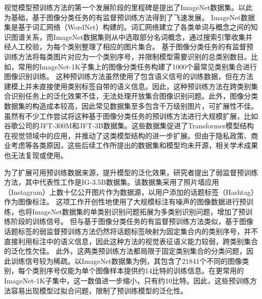 视觉模型预训练方法的第一个发展阶段的里程碑是提出了ImageNet数据集\cite{deng2009imagenet}。以此为基础，基于图像分类任务的有监督预训练方法\cite{alexnet,resnet,googlenet,densenet}得到了飞速发展。
ImageNet数据集是基于词汇网络\cite{miller1995wordnet}（WordNet）构建的。词汇网络建立了各类单词与概念之间的知识图谱关系，而ImageNet数据集则从中选取部分名词概念，通过搜索引擎收集并经人工校验，为每个类别整理了相应的图片集合。
基于图像分类任务的有监督预训练方法将每类图片对应为一个类别序号，并限制模型需要识别的总类别数目。比如，常用的ImageNet-1K子集上的图像分类任务构建了1000个最常见类别集合进行图像识别训练。
这种预训练方法虽然使用了包含语义信号的训练数据，但在方法建模上并未直接使用类别标签自带的语义信息。因此，这种预训练方法在跨类别集合识别任务上的泛化效果不佳\cite{imagnettransfer}，无法处理开放集合图像识别问题。此外，图像分类数据集的构造成本较高，因此常见数据集至多包含千万级别图片，可扩展性不佳。
虽然有不少工作尝试将这种基于图像分类任务的预训练方法进行大规模扩展，比如谷歌公司的JFT-300M\cite{Sun_2017_JFT300m}和JFT-3B\cite{zhai2022scaling}数据集。这些数据集促进了Transformer模型结构\cite{Transformer}在视觉领域中的应用\cite{dosovitskiy2020vit, coatnet}，并推动了这类模型结构的进一步扩展\cite{zhai2022scaling, vit22b}。但由于隐私政策、商业考虑等各类原因，这些后续工作所提出的数据集和模型均未开源，相关学术成果也无法复现或使用。

为了扩展可用预训练数据来源，提升模型的泛化效果，研究者提出了弱监督预训练方法，其中代表性工作是IG-3.5B数据集\cite{mahajan2018exploring}。该数据集采用了照片墙应用（Instagram）上数十亿公开图片作为数据源，以用户添加的话题标签（Hashtag）作为图像标注。
这项工作开创性地使用了大规模标注有噪声的图像数据进行预训练，也将ImageNet数据集的单类别识别问题拓展为多类别识别问题，增加了预训练阶段的训练信号。
但与基于图像分类任务的有监督预训练方法类似，基于图像话题标签的弱监督预训练方法仍然将话题标签映射为固定集合内的类别序号，并不直接利用标注中的语义信息，因此这种方法的视觉表征语义能力较弱，跨类别集合的泛化性欠佳。
此外，这两类预训练方法都局限于固定类别集合的分类问题，因此训练信号较为稀疏。以ImageNet数据集为例，其包含了21841个不同的图像类别，每个类别序号仅能为单个图像样本提供约14比特的训练信息。在更常用的ImageNet-1K子集中，这一数值进一步缩小，只有约10比特。因此，这些预训练方法容易出现模型过拟合问题，限制了预训练模型的泛化性。


